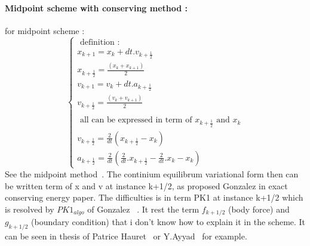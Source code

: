 \documentclass[a4paper,10pt]{article}
\begin{document}
\paragraph{Midpoint scheme with conserving method :}  for midpoint scheme :
\[
\left\{ 
\begin{array}{l}
\text {  definition : }             \\
x_{k+1}     = x_k  + dt . v_{k+ \frac{1}{2}} \\
x_{k+\frac{1}{2}}  = \frac{ ( x_k + x_{k+1} ) }{2} \\
v_{k+1}     = v_k  + dt . a_{k+\frac{1}{2}} \\
v_{k+\frac{1}{2}}  = \frac{ ( v_k + v_{k+1} ) }{2} \\ \\
\text { all can  be expressed in term of  }  x_{k+\frac{1}{2}} \text {  and  } x_k             \\ 
v_{k+\frac{1}{2}}  = \frac{2}{dt} ( x_{k+\frac{1}{2}} - x_k ) \\
a_{k+\frac{1}{2}}  = \frac{2}{dt} (  \frac{2}{dt} . x_{k+\frac{1}{2}}   -     \frac{2}{dt} . x_k    -     x_k    )
\end{array}\right.
\]
See the midpoint method~\cite{MidPoint}. The continium equilibrum variational form then can be written term of x and v at instance k+1/2,  as proposed Gonzalez in exact conserving energy paper. The difficulties is in term PK1 at instance k+1/2 which is resolved by $PK1_{algo}$  of Gonzalez ~\cite{Gonzalez1999}. It rest the term $f_{k+1/2}$ (body force)  and $g_{k+1/2}$ (boundary condition) that i don't know how to explain it in the scheme. It can be seen in thesis of Patrice Hauret~\cite{PHThesis} or Y.Ayyad~\cite{YAyyad} for example.
\end{document}
